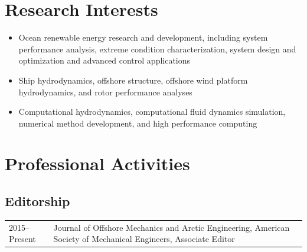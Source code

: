\documentclass[10pt]{article}
\begin{document}
\section*{Research Interests}
\begin{itemize}[leftmargin=*]
\setlength{\itemsep}{-0.5mm}
   \item Ocean renewable energy research and development, including system performance analysis, extreme condition characterization, system design and optimization and advanced control applications
   \item Ship hydrodynamics, offshore structure, offshore wind platform hydrodynamics, and rotor performance analyses
   \item Computational hydrodynamics, computational fluid dynamics simulation, numerical method development, and high performance computing
\end{itemize}

\section*{Professional Activities}
\subsection*{Editorship}
\begin{table}[H]
{\def\arraystretch{1.25}\tabcolsep=0pt
\vspace*{-\baselineskip}
\begin{tabular}{p{0.15\linewidth}p{0.85\linewidth}}
  2015--Present & Journal of Offshore Mechanics and Arctic Engineering, American Society of Mechanical Engineers, Associate Editor
  \end{tabular}%
} \end{table}
\end{document}
